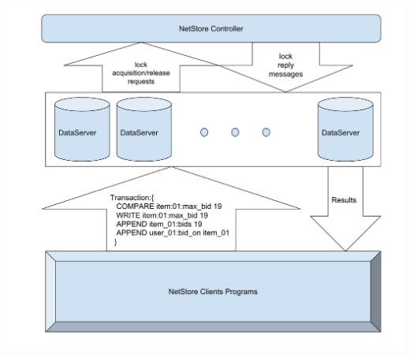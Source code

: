 \documentclass[landscape,archE,fontscale=0.29]{baposter} %
\begin{document}
\begin{poster}
{\begin{multicols*}{2}
\vspace{3 mm}
\begin{center}
  \includegraphics[scale=0.220]{img/sys_arch.pdf}
\end{center}
\end{multicols*}
\vspace{0.2em} %
}



\end{poster}
\end{document}
